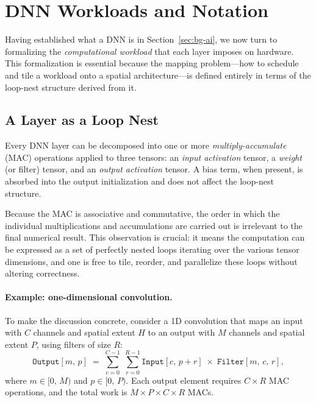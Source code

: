 \section{DNN Workloads and Notation}
\label{sec:bg-workloads}

Having established what a DNN is in Section~\ref{sec:bg-ai}, we now turn to
formalizing the \emph{computational workload} that each layer imposes on
hardware.
This formalization is essential because the mapping problem---how to schedule
and tile a workload onto a spatial architecture---is defined entirely in
terms of the loop-nest structure derived from it.


\subsection{A Layer as a Loop Nest}
\label{sec:loop-nest}

Every DNN layer can be decomposed into one or more
\emph{multiply-accumulate} (MAC) operations applied to three tensors:
an \emph{input activation} tensor, a \emph{weight} (or filter) tensor,
and an \emph{output activation} tensor.
A bias term, when present, is absorbed into the output initialization and
does not affect the loop-nest structure.

Because the MAC is associative and commutative, the order in which the
individual multiplications and accumulations are carried out is
irrelevant to the final numerical result.
This observation is crucial: it means the computation can be expressed as
a set of perfectly nested loops iterating over the various tensor
dimensions, and one is free to tile, reorder, and parallelize these loops
without altering correctness.

\paragraph{Example: one-dimensional convolution.}
To make the discussion concrete, consider a 1D convolution that maps an
input with $C$ channels and spatial extent $H$ to an output with $M$
channels and spatial extent $P$, using filters of size $R$:
\begin{equation}
\label{eq:1dconv}
\texttt{Output}[m,\, p] \;=\; \sum_{c=0}^{C-1}\;\sum_{r=0}^{R-1}
  \texttt{Input}[c,\, p{+}r]\;\times\;\texttt{Filter}[m,\, c,\, r],
\end{equation}
where $m \in [0,\,M)$ and $p \in [0,\,P)$.
Each output element requires $C \times R$ MAC operations, and the total
work is $M \times P \times C \times R$ MACs.

